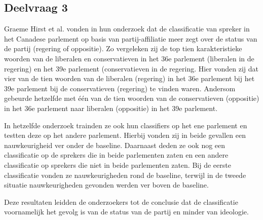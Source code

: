 \subsection{Deelvraag 3}
Graeme Hirst et al. vonden in hun onderzoek dat de classificatie van spreker in het Canadese parlement op basis van partij-affiliatie meer zegt over de status van de partij (regering of oppositie).\cite{Hirst_textto} Zo vergeleken zij de top tien karakteristieke woorden van de liberalen en conservatieven in het 36e parlement (liberalen in de regering) en het 39e parlement (conservatieven in de regering. Hier vonden zij dat vier van de tien woorden van de liberalen (regering) in het 36e parlement bij het 39e parlement bij de conservatieven (regering) te vinden waren. Andersom gebeurde hetzelfde met één van de tien woorden van de conservatieven (oppositie) in het 36e parlement naar liberalen (oppositie) in het 39e parlement.\par
In hetzelfde onderzoek trainden ze ook hun classifiers op het ene parlement en testten deze op het andere parlement. Hierbij vonden zij in beide gevallen een nauwkeurigheid ver onder de baseline. Daarnaast deden ze ook nog een classificatie op de sprekers die in beide parlementen zaten en een andere classificatie op sprekers die niet in beide parlementen zaten. Bij de eerste classificatie vonden ze nauwkeurigheden rond de baseline, terwijl in de tweede situatie  nauwkeurigheden gevonden werden ver boven de baseline. \par
Deze resultaten leidden de onderzoekers tot de conclusie dat de classificatie voornamelijk het gevolg is van de status van de partij en minder van ideologie.

